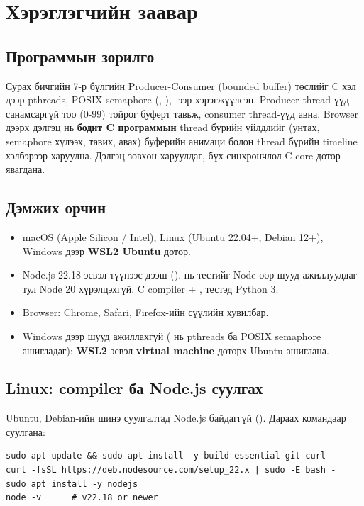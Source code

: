 \documentclass[12pt,a4paper]{article}
\begin{document}
\makecover
\tableofcontents
\clearpage

\section{Хэрэглэгчийн заавар}

\subsection{Программын зорилго}
Сурах бичгийн 7-р бүлгийн Producer-Consumer (bounded buffer) төслийг C хэл дээр pthreads, POSIX semaphore (, ), -ээр хэрэгжүүлсэн. Producer thread-үүд санамсаргүй тоо (0-99) тойрог буферт тавьж, consumer thread-үүд авна. Browser дээрх дэлгэц нь \textbf{бодит C программын} thread бүрийн үйлдлийг (унтах, semaphore хүлээх, тавих, авах) буферийн анимаци болон thread бүрийн timeline хэлбэрээр харуулна. Дэлгэц зөвхөн харуулдаг, бүх синхрончлол C core дотор явагдана.

\subsection{Дэмжих орчин}
\begin{itemize}
  \item macOS (Apple Silicon / Intel), Linux (Ubuntu 22.04+, Debian 12+), Windows дээр \textbf{WSL2 Ubuntu} дотор.
  \item Node.js 22.18 эсвэл түүнээс дээш ().  нь  тестийг Node-оор шууд ажиллуулдаг тул Node 20 хүрэлцэхгүй. C compiler + , тестэд Python 3.
  \item Browser: Chrome, Safari, Firefox-ийн сүүлийн хувилбар.
  \item Windows дээр шууд ажиллахгүй ( нь pthreads ба POSIX semaphore ашигладаг): \textbf{WSL2} эсвэл \textbf{virtual machine} доторх Ubuntu ашиглана.
\end{itemize}

\subsection{Linux: compiler ба Node.js суулгах}
Ubuntu, Debian-ийн шинэ суулгалтад Node.js байдаггүй (). Дараах командаар суулгана:
\begin{lstlisting}[style=shell,breaklines=true]
sudo apt update && sudo apt install -y build-essential git curl
curl -fsSL https://deb.nodesource.com/setup_22.x | sudo -E bash -
sudo apt install -y nodejs
node -v      # v22.18 or newer
\end{lstlisting}
\end{document}
